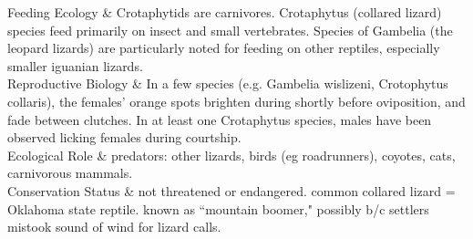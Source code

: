 \begin{center}
\begin{longtabu}
	\hline
	Feeding Ecology & 
	Crotaphytids are carnivores. Crotaphytus (collared lizard) species feed primarily on insect and small vertebrates. Species of Gambelia (the leopard lizards) are particularly noted for feeding on other reptiles, especially smaller iguanian lizards.
	\\
	\hline
	Reproductive Biology & 
	In a few species (e.g. Gambelia wislizeni, Crotophytus collaris), the females' orange spots brighten during shortly before oviposition, and fade between clutches. In at least one Crotaphytus species, males have been observed licking females during courtship.
	\\
	\hline
	Ecological Role &
	predators: other lizards, birds (eg roadrunners), coyotes, cats, carnivorous mammals.
	\\
	\hline
	Conservation Status & 
	not threatened or endangered. common collared lizard = Oklahoma state reptile. known as ``mountain boomer," possibly b/c settlers mistook sound of wind for lizard calls.
	\\
	\hline
\end{longtabu}
\end{center}